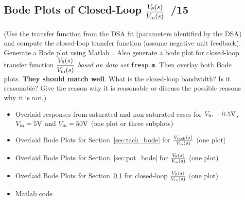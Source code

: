 \documentclass{article}
\newcommand{\score}{\hfill \underline{\hspace{0.65cm}}\,/} %
\newcommand\RR{\textsuperscript{\textregistered}~} %
\begin{document}
\subsection{Bode Plots of Closed-Loop $\displaystyle \frac{V_{\theta}(s)}{V_{\rm in}(s)}$ \score 15}
\label{sec:pot_bode_cl}
(Use the transfer function from the DSA fit (parameters identified by the DSA) and compute the closed-loop transfer function (assume negative unit feedback). Generate a Bode plot using {\sc Matlab}\RR. Also generate a bode plot for closed-loop transfer function $\displaystyle \frac{V_{\theta}(s)}{V_{\rm in}(s)}$ \emph{based on data set} \texttt{fresp.m}. Then overlay both Bode plots. {\bf They should match well}. What is the closed-loop bandwidth? Is it reasonable? Give the reason why it is reasonable or discuss the possible reasons why it is not.)
\newline \\[3mm]
\begin{itemize}
\item Overlaid responses from saturated and non-saturated cases for $V_{\rm in} =0.5\si{\volt}$, $V_{\rm in} =5\si{\volt}$ and $V_{\rm in} =50\si{\volt}$ (one plot or three subplots)
\item Overlaid Bode Plots for Section~\ref{sec:tach_bode} for $ \frac{V_{\rm tach}(s)}{V_{\rm in}(s)}$ (one plot)
\item Overlaid Bode Plots for Section~\ref{sec:pot_bode} for $ \frac{V_{\theta}(s)}{V_{\rm in}(s)}$ (one plot)
\item Overlaid Bode Plots for Section~\ref{sec:pot_bode_cl} for closed-loop $ \frac{V_{\theta}(s)}{V_{\rm in}(s)}$ (one plot)
\item {\sc Matlab} code
\end{itemize} 

\end{document}
